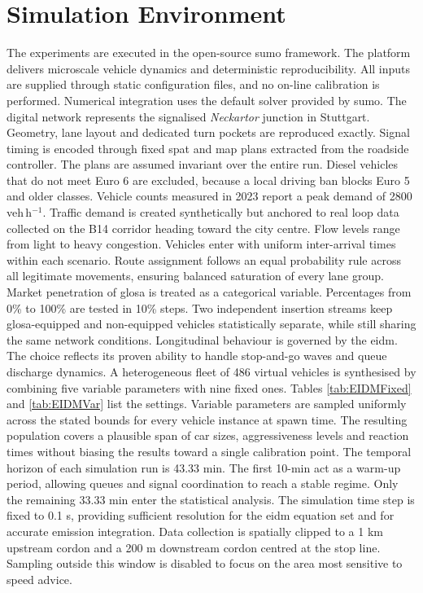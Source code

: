 \section{Simulation Environment}
\label{sec:SimEnvironment}
The experiments are executed in the open-source \ac{sumo} framework. The platform delivers microscale vehicle dynamics and deterministic reproducibility. All inputs are supplied through static configuration files, and no on-line calibration is performed. Numerical integration uses the default solver provided by \ac{sumo}.
\mynewline
The digital network represents the signalised \emph{Neckartor} junction in Stuttgart. Geometry, lane layout and dedicated turn pockets are reproduced exactly. Signal timing is encoded through fixed \ac{spat} and \ac{map} plans extracted from the roadside controller. The plans are assumed invariant over the entire run. Diesel vehicles that do not meet Euro 6 are excluded, because a local driving ban blocks Euro 5 and older classes. Vehicle counts measured in 2023 report a peak demand of 2800\,veh\,h\(^{-1}\).
\mynewline
Traffic demand is created synthetically but anchored to real loop data collected on the B14 corridor heading toward the city centre. Flow levels range from light to heavy congestion. Vehicles enter with uniform inter-arrival times within each scenario. Route assignment follows an equal probability rule across all legitimate movements, ensuring balanced saturation of every lane group. Market penetration of \ac{glosa} is treated as a categorical variable. Percentages from 0\% to 100\% are tested in 10\% steps. Two independent insertion streams keep \ac{glosa}-equipped and non-equipped vehicles statistically separate, while still sharing the same network conditions.
\mynewline
Longitudinal behaviour is governed by the \ac{eidm}. The choice reflects its proven ability to handle stop-and-go waves and queue discharge dynamics.  A heterogeneous fleet of 486 virtual vehicles is synthesised by combining five variable parameters with nine fixed ones. Tables \ref{tab:EIDMFixed} and \ref{tab:EIDMVar} list the settings. Variable parameters are sampled uniformly across the stated bounds for every vehicle instance at spawn time. The resulting population covers a plausible span of car sizes, aggressiveness levels and reaction times without biasing the results toward a single calibration point.
\mynewline
The temporal horizon of each simulation run is 43.33 min. The first 10-min act as a warm-up period, allowing queues and signal coordination to reach a stable regime. Only the remaining 33.33 min enter the statistical analysis. The simulation time step is fixed to 0.1 s, providing sufficient resolution for the \ac{eidm} equation set and for accurate emission integration. Data collection is spatially clipped to a 1 km upstream cordon and a 200 m downstream cordon centred at the stop line. Sampling outside this window is disabled to focus on the area most sensitive to speed advice.
